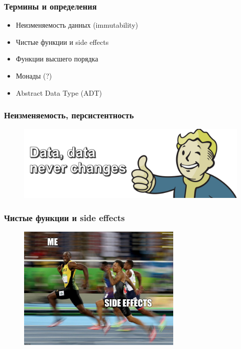 \documentclass[18pt, compress, aspectratio=169]{beamer}
\begin{document}
\begin{frame}[fragile]
    \frametitle{Термины и определения}
    \begin{itemize}[label={\MVRightarrow}]
        \item Неизменяемость данных (immutability)
        \item Чистые функции и side effects
        \item Функции высшего порядка
        \item Монады (?)
        \item Abstract Data Type (ADT)
    \end{itemize}
\end{frame}

\begin{frame}
    \frametitle{Неизменяемость, персистентность}
    \vspace{-20pt}
    \begin{figure}
        \includegraphics[width=1.0\textwidth,center]{Vault_Boy_text.png}
    \end{figure}
\end{frame}

\begin{frame}
    \frametitle{Чистые функции и side effects}
    \vspace{-25pt}
    \begin{figure}
        \includegraphics[width=0.7\textwidth,center]{side_effect.jpg}
    \end{figure}
\end{frame}
\end{document}
